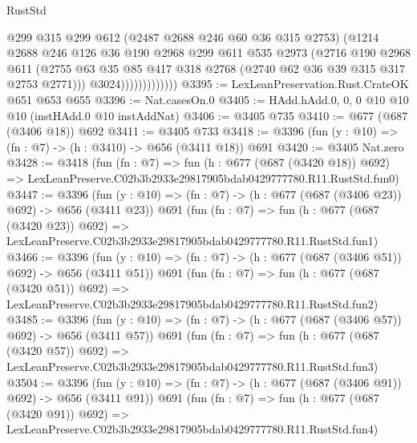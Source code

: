 \begin{lexlean}{RustStd}
\begin{coremodule}
                            @299
                            @315
                            @299
                            @612
                            (@2487 @2688 @246 @60 @36 @315 @2753)
                            (@1214
                              @2688
                              @246
                              @126
                              @36
                              @190
                              @2968
                              @299
                              @611
                              @535
                              @2973
                              (@2716
                                @190
                                @2968
                                @611
                                (@2755
                                  @63
                                  @35
                                  @85
                                  @417
                                  @318
                                  @2768
                                  (@2740 @62 @36 @39 @315 @317 @2753 @2771)))
                              @3024)))))))))))))
@3395 := LexLeanPreservation.Rust.CrateOK @651 @653 @655
@3396 := Nat.casesOn.{0}
@3405 := HAdd.hAdd.{0, 0, 0} @10 @10 @10 (instHAdd.{0} @10 instAddNat)
@3406 := @3405 @735
@3410 := @677 (@687 (@3406 @18)) @692
@3411 := @3405 @733
@3418 := @3396 (fun (y : @10) => (fn : @7) -> (h : @3410) -> @656 (@3411 @18)) @691
@3420 := @3405 Nat.zero
@3428 := @3418
    (fun (fn : @7) =>
    fun (h : @677 (@687 (@3420 @18)) @692) =>
    LexLeanPreserve.C02b3b2933e29817905bdab0429777780.R11.RustStd.fun0)
@3447 := @3396
    (fun (y : @10) => (fn : @7) -> (h : @677 (@687 (@3406 @23)) @692) -> @656 (@3411 @23))
    @691
    (fun (fn : @7) =>
    fun (h : @677 (@687 (@3420 @23)) @692) =>
    LexLeanPreserve.C02b3b2933e29817905bdab0429777780.R11.RustStd.fun1)
@3466 := @3396
    (fun (y : @10) => (fn : @7) -> (h : @677 (@687 (@3406 @51)) @692) -> @656 (@3411 @51))
    @691
    (fun (fn : @7) =>
    fun (h : @677 (@687 (@3420 @51)) @692) =>
    LexLeanPreserve.C02b3b2933e29817905bdab0429777780.R11.RustStd.fun2)
@3485 := @3396
    (fun (y : @10) => (fn : @7) -> (h : @677 (@687 (@3406 @57)) @692) -> @656 (@3411 @57))
    @691
    (fun (fn : @7) =>
    fun (h : @677 (@687 (@3420 @57)) @692) =>
    LexLeanPreserve.C02b3b2933e29817905bdab0429777780.R11.RustStd.fun3)
@3504 := @3396
    (fun (y : @10) => (fn : @7) -> (h : @677 (@687 (@3406 @91)) @692) -> @656 (@3411 @91))
    @691
    (fun (fn : @7) =>
    fun (h : @677 (@687 (@3420 @91)) @692) =>
    LexLeanPreserve.C02b3b2933e29817905bdab0429777780.R11.RustStd.fun4)

\end{coremodule}
\end{lexlean}
